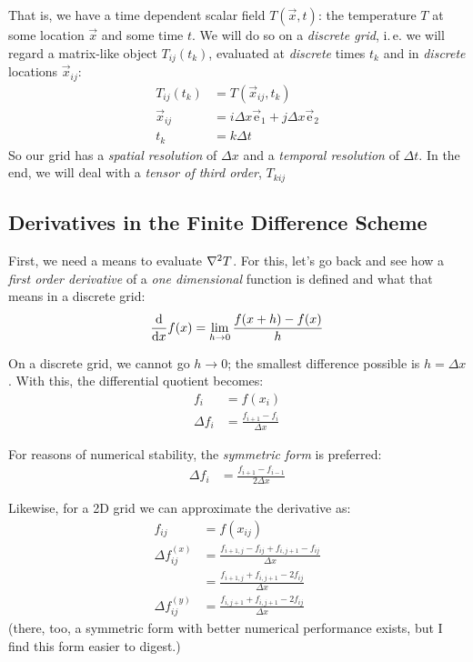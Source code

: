 \documentclass[
	english,
	fontsize=10pt,
	parskip=half,
	titlepage=true,
	DIV=12
]{scrartcl}
\newcommand*{\ie}{i.\,e. }
\begin{document}
That is, we have a time dependent scalar field $T(\vec{x}, t)$: the temperature $T$ at some location $\vec{x}$ and some time $t$. We will do so on a \emph{discrete grid}, \ie we will regard a matrix-like object $T_{ij}(t_k)$, evaluated at \emph{discrete} times $t_k$ and in \emph{discrete} locations $\vec{x}_{ij}$:
\begin{align*}
	T_{ij}(t_k) &= T(\vec{x}_{ij}, t_k) \\
	\vec{x}_{ij} &= i \Delta x \vec{\text{e}}_1  + j \Delta x \vec{\text{e}}_2 \\
	t_k &= k \Delta t
\end{align*}
So our grid has a \emph{spatial resolution} of $\Delta x$ and a \emph{temporal resolution} of $\Delta t$. In the end, we will deal with a \emph{tensor of third order}, $T_{kij}$

\subsection{Derivatives in the Finite Difference Scheme}
First, we need a means to evaluate $\laplacian T$. For this, let's go back and see how a \emph{first order derivative} of a \emph{one dimensional} function is defined and what that means in a discrete grid:
\[ \dv{x} f(x) = \lim_{h \to 0} \frac{f(x + h) - f(x)}{h} \]

On a discrete grid, we cannot go $h \to 0$; the smallest difference possible is $h = \Delta x$. With this, the differential quotient becomes:
\begin{align*}
	f_i &= f(x_i) \\
	\Delta f_i &= \frac{f_{i + 1} - f_i}{\Delta x}
\end{align*}

For reasons of numerical stability, the \emph{symmetric form} is preferred:
\begin{align*}
	\Delta f_{i} &= \frac{f_{i + 1} - f_{i - 1}}{2\Delta x}
\end{align*}

Likewise, for a 2D grid we can approximate the derivative as:
\begin{align*}
	f_{ij} &= f(x_{ij}) \\
	\Delta f^{(x)}_{ij} 
&=
	\frac{f_{i + 1, j} - f_{ij} + f_{i, j + 1} - f_{ij}}{\Delta x} \\
&=
	\frac{f_{i + 1, j} + f_{i, j + 1} - 2 f_{ij}}{\Delta x}
\\
	\Delta f^{(y)}_{ij} 
&=
	\frac{f_{i, j + 1} + f_{i, j + 1} - 2 f_{ij}}{\Delta x}
\end{align*}
(there, too, a symmetric form with better numerical performance exists, but I find this form easier to digest.)
\end{document}
